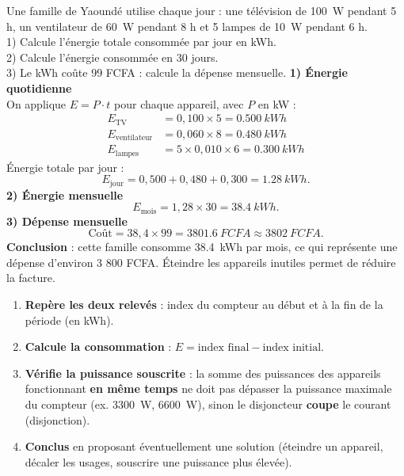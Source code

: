 \documentclass[11pt]{article}
\begin{document}
\begin{exoresolu}
Une famille de Yaoundé utilise chaque jour : une télévision de \SI{100}{W} pendant 5 h, un ventilateur de \SI{60}{W} pendant 8 h et 5 lampes de \SI{10}{W} pendant 6 h.\\
1) Calcule l'énergie totale consommée par jour en kWh.\\
2) Calcule l'énergie consommée en 30 jours.\\
3) Le kWh coûte 99 FCFA : calcule la dépense mensuelle.
\tcblower
\textbf{1) Énergie quotidienne}\\
On applique $E = P \cdot t$ pour chaque appareil, avec $P$ en kW :
\begin{align*}
E_{\text{TV}} &= 0,100 \times 5 = \SI{0,500}{kWh} \\
E_{\text{ventilateur}} &= 0,060 \times 8 = \SI{0,480}{kWh} \\
E_{\text{lampes}} &= 5 \times 0,010 \times 6 = \SI{0,300}{kWh}
\end{align*}
Énergie totale par jour :
\[ E_{\text{jour}} = 0,500 + 0,480 + 0,300 = \SI{1,28}{kWh}. \]
\textbf{2) Énergie mensuelle}\\
\[ E_{\text{mois}} = 1,28 \times 30 = \SI{38,4}{kWh}. \]
\textbf{3) Dépense mensuelle}\\
\[ \text{Coût} = 38,4 \times 99 = \SI{3801,6}{FCFA} \approx \SI{3802}{FCFA}. \]
\textbf{Conclusion} : cette famille consomme \SI{38,4}{kWh} par mois, ce qui représente une dépense d'environ 3 800 FCFA. Éteindre les appareils inutiles permet de réduire la facture.
\end{exoresolu}

\begin{methode}
\begin{enumerate}
\item \textbf{Repère les deux relevés} : index du compteur au début et à la fin de la période (en kWh).
\item \textbf{Calcule la consommation} : $E = \text{index final} - \text{index initial}$.
\item \textbf{Vérifie la puissance souscrite} : la somme des puissances des appareils fonctionnant \textbf{en même temps} ne doit pas dépasser la puissance maximale du compteur (ex. \SI{3300}{W}, \SI{6600}{W}), sinon le disjoncteur \textbf{coupe} le courant (disjonction).
\item \textbf{Conclus} en proposant éventuellement une solution (éteindre un appareil, décaler les usages, souscrire une puissance plus élevée).
\end{enumerate}
\end{methode}
\end{document}
